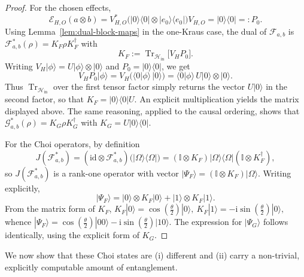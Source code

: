 \documentclass[11pt, reco]{article}
\begin{document}
\begin{proof}
For the chosen effects,
\[
\mathcal{E}_{H,O}(a\otimes b)
=
V_{H,O}^{*}\bigl(|0\rangle\langle 0|\otimes|e_0\rangle\langle e_0|\bigr)V_{H,O}
=
|0\rangle\langle 0|=:P_0.
\]
Using Lemma~\ref{lem:dual-block-maps} in the one-Kraus case, the dual of \(\mathcal{F}_{a,b}\) is
\(\mathcal{F}_{a,b}^*(\rho)=K_F\rho K_F^{\dagger}\) with
\[
K_F
:=
\operatorname{Tr}_{\mathcal{H}_{\mathrm{in}}}\bigl[V_H P_0\bigr].
\]
Writing \(V_H|\phi\rangle=U|\phi\rangle\otimes|0\rangle\) and \(P_0=|0\rangle\langle 0|\), we get
\[
V_H P_0|\phi\rangle
=
V_H\bigl(\langle 0|\phi\rangle\,|0\rangle\bigr)
=
\langle 0|\phi\rangle\,U|0\rangle\otimes|0\rangle.
\]
Thus \(\operatorname{Tr}_{\mathcal{H}_{\mathrm{in}}}\) over the first tensor factor simply returns the vector \(U|0\rangle\) in the second factor, so that
\(K_F=|0\rangle\langle 0|U\). An explicit multiplication yields the matrix displayed above. The same reasoning,
applied to the causal ordering, shows that \(\mathcal{G}_{a,b}^*(\rho)=K_G\rho K_G^{\dagger}\) with \(K_G=U|0\rangle\langle 0|\).

For the Choi operators, by definition
\[
J(\mathcal{F}_{a,b}^*)
=
(\mathrm{id}\otimes\mathcal{F}_{a,b}^*)\bigl(|\Omega\rangle\langle\Omega|\bigr)
=
(\mathbb{I}\otimes K_F)|\Omega\rangle\langle\Omega|(\mathbb{I}\otimes K_F^{\dagger}),
\]
so \(J(\mathcal{F}_{a,b}^*)\) is a rank-one operator with vector \(|\Psi_F\rangle=(\mathbb{I}\otimes K_F)|\Omega\rangle\). Writing explicitly,
\[
|\Psi_F\rangle
=
|0\rangle\otimes K_F|0\rangle
+
|1\rangle\otimes K_F|1\rangle.
\]
From the matrix form of \(K_F\),
\(
K_F|0\rangle=\cos(\tfrac{\theta}{2})|0\rangle,
\ K_F|1\rangle=-\mathrm{i}\sin(\tfrac{\theta}{2})|0\rangle,
\)
whence
\(
|\Psi_F\rangle
=
\cos(\tfrac{\theta}{2})|00\rangle
-\mathrm{i}\sin(\tfrac{\theta}{2})|10\rangle
\).
The expression for \(|\Psi_G\rangle\) follows identically, using the explicit form of \(K_G\).
\end{proof}

We now show that these Choi states are (i) different and (ii) carry a non-trivial, explicitly computable amount of entanglement.
\end{document}
